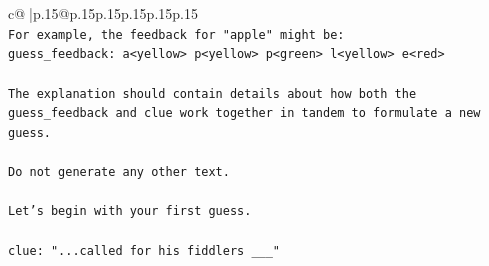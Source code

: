 \documentclass{article}
\begin{document}
{\begin{supertabular}{c@{$\;$}|p{.15\linewidth}@{}p{.15\linewidth}p{.15\linewidth}p{.15\linewidth}p{.15\linewidth}p{.15\linewidth}}
{{{\\ 
\texttt{For example, the feedback for "apple" might be:} \\
\texttt{guess\_feedback: a<yellow> p<yellow> p<green> l<yellow> e<red>} \\
\\ 
\texttt{The explanation should contain details about how both the guess\_feedback and clue work together in tandem to formulate a new guess.} \\
\\ 
\texttt{Do not generate any other text.} \\
\\ 
\texttt{Let's begin with your first guess.} \\
\\ 
\texttt{clue: "...called for his fiddlers \_\_\_"} \\
            }
        }
    }
     \\ \\


\end{supertabular}}
\end{document}

